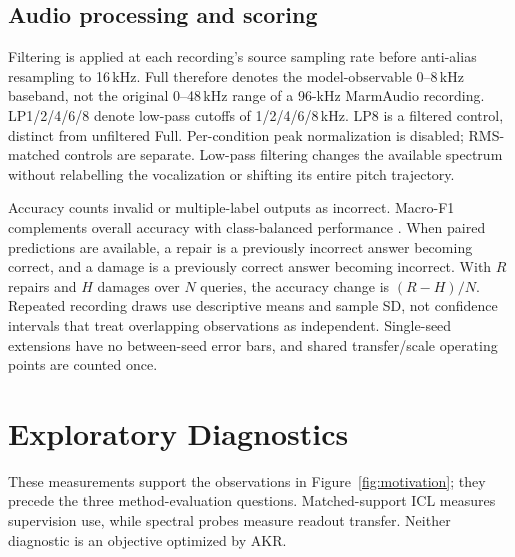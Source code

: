 \documentclass{article}
\begin{document}
\subsection{Audio processing and scoring}
Filtering is applied at each recording's source sampling rate before anti-alias resampling to 16\,kHz. Full therefore denotes the model-observable 0--8\,kHz baseband, not the original 0--48\,kHz range of a 96-kHz MarmAudio recording. LP1/2/4/6/8 denote low-pass cutoffs of 1/2/4/6/8\,kHz. LP8 is a filtered control, distinct from unfiltered Full. Per-condition peak normalization is disabled; RMS-matched controls are separate. Low-pass filtering changes the available spectrum without relabelling the vocalization or shifting its entire pitch trajectory.

Accuracy counts invalid or multiple-label outputs as incorrect. Macro-F1 complements overall accuracy with class-balanced performance \citep{sokolova2009systematic}. When paired predictions are available, a repair is a previously incorrect answer becoming correct, and a damage is a previously correct answer becoming incorrect. With $R$ repairs and $H$ damages over $N$ queries, the accuracy change is $(R-H)/N$. Repeated recording draws use descriptive means and sample SD, not confidence intervals that treat overlapping observations as independent. Single-seed extensions have no between-seed error bars, and shared transfer/scale operating points are counted once.

\clearpage
\section{Exploratory Diagnostics}
\label{app:diagnosis}
\label{sec:diagnosis}
\label{app:motivation_protocol}
These measurements support the observations in Figure~\ref{fig:motivation}; they precede the three method-evaluation questions. Matched-support ICL measures supervision use, while spectral probes measure readout transfer. Neither diagnostic is an objective optimized by AKR.
\end{document}

